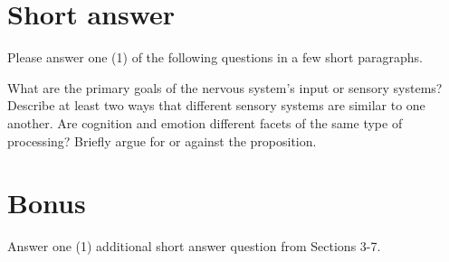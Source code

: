 \documentclass[]{exam}
\begin{document}
\begin{questions}
\newpage
\section{Short answer}

Please answer one (1) of the following questions in a few short paragraphs.

\question What are the primary goals of the nervous system's input or sensory systems? Describe at least two ways that different sensory systems are similar to one another.
\vspace{2.5in}
\question Are cognition and emotion different facets of the same type of processing? Briefly argue for or against the proposition.

\newpage
\section{Bonus}

Answer one (1) additional short answer question from Sections 3-7.

\end{questions}
\end{document}
